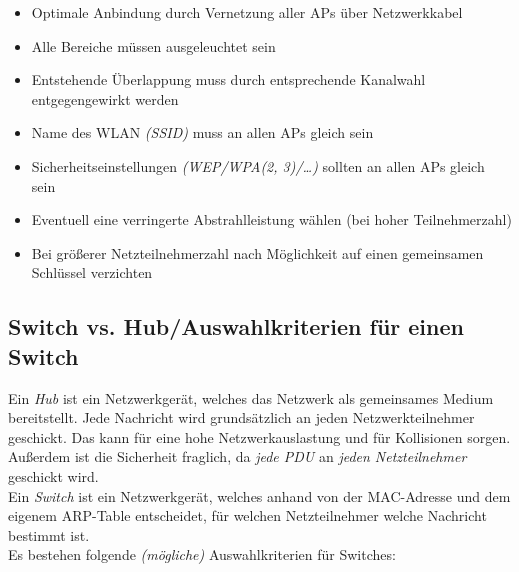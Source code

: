 \documentclass[a4paper, 12pt]{report}
\begin{document}
\begin{itemize}
    \item Optimale Anbindung durch Vernetzung aller APs über Netzwerkkabel
    \item Alle Bereiche müssen ausgeleuchtet sein
    \item Entstehende Überlappung muss durch entsprechende Kanalwahl 
        entgegengewirkt werden
    \item Name des WLAN \emph{(SSID)} muss an allen APs gleich sein
    \item Sicherheitseinstellungen \emph{(WEP/WPA(2, 3)/\dots)} sollten an allen 
        APs gleich sein
    \item Eventuell eine verringerte Abstrahlleistung wählen (bei hoher 
        Teilnehmerzahl)
    \item Bei größerer Netzteilnehmerzahl nach Möglichkeit auf einen gemeinsamen 
        Schlüssel verzichten
\end{itemize}

\subsection{Switch vs. Hub/Auswahlkriterien für einen Switch}

Ein \emph{Hub} ist ein Netzwerkgerät, welches das Netzwerk als gemeinsames 
Medium bereitstellt. Jede Nachricht wird grundsätzlich an jeden 
Netzwerkteilnehmer geschickt. Das kann für eine hohe Netzwerkauslastung und für 
Kollisionen sorgen. Außerdem ist die Sicherheit fraglich, da \emph{jede PDU} an 
\emph{jeden Netzteilnehmer} geschickt wird. \\

Ein \emph{Switch} ist ein Netzwerkgerät, welches anhand von der MAC-Adresse und 
dem eigenem ARP-Table entscheidet, für welchen Netzteilnehmer welche Nachricht 
bestimmt ist. \\

Es bestehen folgende \emph{(mögliche)} Auswahlkriterien für Switches:
\end{document}
